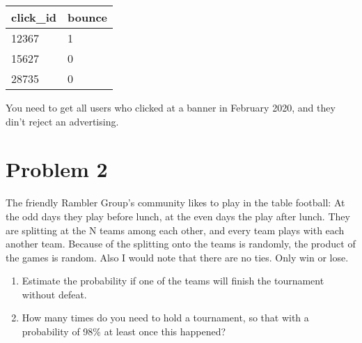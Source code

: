 \documentclass[12pt, a4paper]{article}
\begin{document}
\begin{table}[h]
	\begin{tabular}{|l|l|}
		\hline
		click\_id & bounce	\\ \hline
		12367 	  & 1       \\ \hline
		15627 	  & 0       \\ \hline
		28735     & 0		\\ \hline	
	\end{tabular}
\end{table}

\noindent
You need to get all users who clicked at a banner in February 2020, and 
they din't reject an advertising.

\newpage
\section*{Problem 2}
%

\noindent
The friendly Rambler Group's community likes to play in the table football: 
At the odd days they play before lunch, at the even days the play after lunch.
They are splitting at the N teams among each other, and every team plays with each another team.
Because of the splitting onto the teams is randomly, the product of the games is random.
Also I would note that there are no ties. Only win or lose.
\begin{enumerate}
	\item Estimate the probability if one of the teams will finish the tournament without defeat.
	\item How many times do you need to hold a tournament, so that with a probability of 98\% at least once this happened?
\end{enumerate} 
\end{document}
